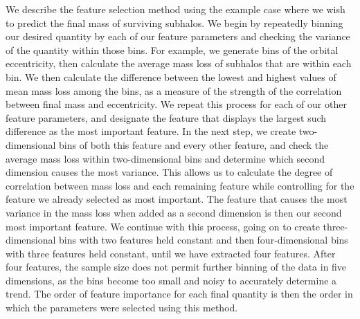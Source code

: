 \documentclass[fleqn,usenatbib]{mnras}
\begin{document}
We describe the feature selection method using the example case where we wish to predict the final mass of surviving subhalos. We begin by repeatedly binning our desired quantity by each of our feature parameters and checking the variance of the quantity within those bins. For example, we generate bins of the orbital eccentricity, then calculate the average mass loss of subhalos that are within each bin. We then calculate the difference between the lowest and highest values of mean mass loss among the bins, as a measure of the strength of the correlation between final mass and eccentricity. We repeat this process for each of our other feature parameters, and designate the feature that displays the largest such difference as the most important feature. In the next step, we create two-dimensional bins of both this feature and every other feature, and check the average mass loss within two-dimensional bins and determine which second dimension causes the most variance. This allows us to calculate the degree of correlation between mass loss and each remaining feature while controlling for the feature we already selected as most important. The feature that causes the most variance in the mass loss when added as a second dimension is then our second most important feature. We continue with this process, going on to create three-dimensional bins with two features held constant and then four-dimensional bins with three features held constant, until we have extracted four features. After four features, the sample size does not permit further binning of the data in five dimensions, as the bins become too small and noisy to accurately determine a trend. The order of feature importance for each final quantity is then the order in which the parameters were selected using this method.
\end{document}
